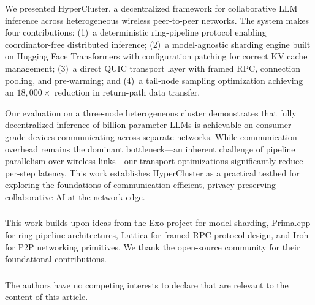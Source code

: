 \documentclass[runningheads]{llncs}
\begin{document}
We presented HyperCluster, a decentralized framework for collaborative LLM inference across heterogeneous wireless peer-to-peer networks. The system makes four contributions: (1)~a deterministic ring-pipeline protocol enabling coordinator-free distributed inference; (2)~a model-agnostic sharding engine built on Hugging Face Transformers with configuration patching for correct KV cache management; (3)~a direct QUIC transport layer with framed RPC, connection pooling, and pre-warming; and (4)~a tail-node sampling optimization achieving an $18{,}000\times$ reduction in return-path data transfer.

Our evaluation on a three-node heterogeneous cluster demonstrates that fully decentralized inference of billion-parameter LLMs is achievable on consumer-grade devices communicating across separate networks. While communication overhead remains the dominant bottleneck---an inherent challenge of pipeline parallelism over wireless links---our transport optimizations significantly reduce per-step latency. This work establishes HyperCluster as a practical testbed for exploring the foundations of communication-efficient, privacy-preserving collaborative AI at the network edge.

\begin{credits}
\subsubsection{\ackname}
This work builds upon ideas from the Exo project for model sharding, Prima.cpp for ring pipeline architectures, Lattica for framed RPC protocol design, and Iroh for P2P networking primitives. We thank the open-source community for their foundational contributions.

\subsubsection{\discintname}
The authors have no competing interests to declare that are relevant to the content of this article.
\end{credits}
\end{document}
